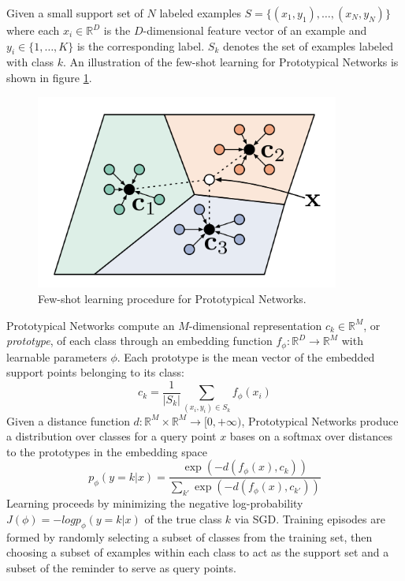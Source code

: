 \documentclass{article}
\begin{document}
Given a small support set of $N$ labeled examples $S=\{(x_1,y_1),\dots,(x_N,y_N)\}$ where each $x_i\in\mathbb{R}^D$ is the $D$-dimensional feature vector of an example and $y_i\in\{1,\dots,K \}$ is the corresponding label. $S_k$ denotes the set of examples labeled with class $k$. An illustration of the few-shot learning for Prototypical Networks is shown in figure \ref{fig:proto}.

\begin{figure}[h]
\centering
\includegraphics[width=10cm]{figures/prototype}
\caption{Few-shot learning procedure for Prototypical Networks.}\label{fig:proto}
\end{figure}

Prototypical Networks compute an $M$-dimensional representation $c_k\in\mathbb{R}^M$, or \textit{prototype}, of each class through an embedding function $f_{\phi}:\mathbb{R}^D\to\mathbb{R}^M$ with learnable parameters $\phi$. Each prototype is the mean vector of the embedded support points belonging to its class:
\begin{equation}\label{eq:prototype}
c_k=\frac{1}{|S_k|}\sum_{(x_i,y_i)\in S_k}f_{\phi}(x_i)
\end{equation}
Given a distance function $d:\mathbb{R}^M\times\mathbb{R}^M\to[0,+\infty)$, Prototypical Networks produce a distribution over classes for a query point $x$ bases on a softmax over distances to the prototypes in the embedding space
\begin{equation}\label{eq:prediction}
p_{\phi}(y=k|x)=\frac{\exp(-d(f_{\phi}(x),c_k))}{\sum_{k'}\exp(-d(f_{\phi}(x),c_{k'}))}
\end{equation}
Learning proceeds by minimizing the negative log-probability $J(\phi)=-log p_{\phi}(y=k|x)$ of the true class $k$ via SGD. Training episodes are formed by randomly selecting a subset of classes from the training set, then choosing a subset of examples within each class to act as the support set and a subset of the reminder to serve as query points.
\end{document}
